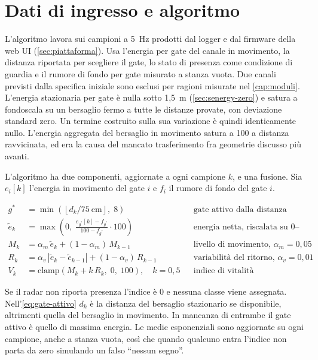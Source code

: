 \section{Dati di ingresso e algoritmo}
\label{sec:vitalita-ingressi}
\label{sec:vitalita-algoritmo}

L'algoritmo lavora sui campioni a 5~Hz prodotti dal logger e dal firmware della web
UI (\cref{sec:piattaforma}). Usa l'energia per gate del canale in movimento, la
distanza riportata per scegliere il gate, lo stato di presenza come condizione di
guardia e il rumore di fondo per gate misurato a stanza vuota. Due canali previsti
dalla specifica iniziale sono esclusi per ragioni misurate nel \cref{cap:moduli}.
L'energia stazionaria per gate è nulla sotto 1,5~m (\cref{sec:senergy-zero}) e satura
a fondoscala su un bersaglio fermo a tutte le distanze provate, con deviazione
standard zero. Un termine costruito sulla sua variazione è quindi identicamente
nullo. L'energia aggregata del bersaglio in movimento satura a 100 a distanza
ravvicinata, ed era la causa del mancato trasferimento fra geometrie discusso più
avanti.

L'algoritmo ha due componenti, aggiornate a ogni campione $k$, e una fusione. Sia
$e_i[k]$ l'energia in movimento del gate $i$ e $f_i$ il rumore di fondo del gate $i$.

\begin{align}
g^{*} &= \min\!\left(\left\lfloor d_k / 75~\text{cm} \right\rfloor,\; 8\right)
  && \text{gate attivo dalla distanza riportata} \label{eq:gate-attivo}\\
\tilde e_k &= \max\!\left(0,\; \frac{e_{g^{*}}[k] - f_{g^{*}}}{100 - f_{g^{*}}} \cdot 100\right)
  && \text{energia netta, riscalata su 0--100} \label{eq:netta}\\
M_k &= \alpha_m\, \tilde e_k + (1-\alpha_m)\, M_{k-1}
  && \text{livello di movimento, } \alpha_m = 0{,}05 \label{eq:livello}\\
R_k &= \alpha_v\, \left|\tilde e_k - \tilde e_{k-1}\right| + (1-\alpha_v)\, R_{k-1}
  && \text{variabilità del ritorno, } \alpha_v = 0{,}01 \label{eq:variabilita}\\
V_k &= \mathrm{clamp}\!\left(M_k + k\, R_k,\; 0,\; 100\right), \quad k = 0{,}5
  && \text{indice di vitalità} \label{eq:vitalita}
\end{align}

Se il radar non riporta presenza l'indice è 0 e nessuna classe viene assegnata.
Nell'\cref{eq:gate-attivo} $d_k$ è la distanza del bersaglio stazionario se
disponibile, altrimenti quella del bersaglio in movimento. In mancanza di entrambe il
gate attivo è quello di massima energia. Le medie esponenziali sono aggiornate su ogni
campione, anche a stanza vuota, così che quando qualcuno entra l'indice non parta da
zero simulando un falso ``nessun segno''.

